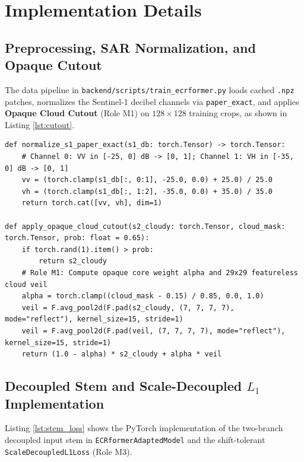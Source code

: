 \documentclass[12pt,a4paper]{report}
\begin{document}
\chapter{Implementation Details}

\section{Preprocessing, SAR Normalization, and Opaque Cutout}
The data pipeline in \texttt{backend/scripts/train\_ecrformer.py} loads cached \texttt{.npz} patches, normalizes the Sentinel-1 decibel channels via \texttt{paper\_exact}, and applies \textbf{Opaque Cloud Cutout} (Role M1) on $128\times 128$ training crops, as shown in Listing \ref{lst:cutout}.

\begin{lstlisting}[caption={SAR Normalization and Anti-Shortcut Opaque Cloud Cutout (\texttt{train\_ecrformer.py})},label={lst:cutout}]
def normalize_s1_paper_exact(s1_db: torch.Tensor) -> torch.Tensor:
    # Channel 0: VV in [-25, 0] dB -> [0, 1]; Channel 1: VH in [-35, 0] dB -> [0, 1]
    vv = (torch.clamp(s1_db[:, 0:1], -25.0, 0.0) + 25.0) / 25.0
    vh = (torch.clamp(s1_db[:, 1:2], -35.0, 0.0) + 35.0) / 35.0
    return torch.cat([vv, vh], dim=1)

def apply_opaque_cloud_cutout(s2_cloudy: torch.Tensor, cloud_mask: torch.Tensor, prob: float = 0.65):
    if torch.rand(1).item() > prob:
        return s2_cloudy
    # Role M1: Compute opaque core weight alpha and 29x29 featureless cloud veil
    alpha = torch.clamp((cloud_mask - 0.15) / 0.85, 0.0, 1.0)
    veil = F.avg_pool2d(F.pad(s2_cloudy, (7, 7, 7, 7), mode="reflect"), kernel_size=15, stride=1)
    veil = F.avg_pool2d(F.pad(veil, (7, 7, 7, 7), mode="reflect"), kernel_size=15, stride=1)
    return (1.0 - alpha) * s2_cloudy + alpha * veil
\end{lstlisting}

\section{Decoupled Stem and Scale-Decoupled $L_1$ Implementation}
Listing \ref{lst:stem_loss} shows the PyTorch implementation of the two-branch decoupled input stem in \texttt{ECRformerAdaptedModel} and the shift-tolerant \texttt{ScaleDecoupledL1Loss} (Role M3).
\end{document}
